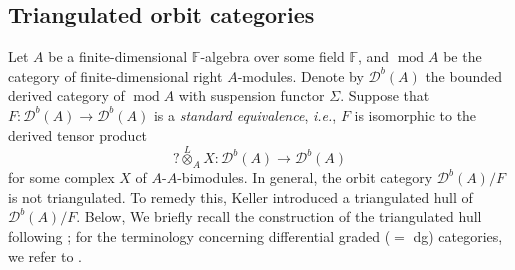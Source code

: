 \documentclass[12pt,reqno]{amsart}
\numberwithin{equation}{section}
\newcommand{\ie}{{\em i.e.}}
\renewcommand{\mod}{\operatorname{mod}\nolimits}
\newcommand{\Hom}{\operatorname{Hom}\nolimits}
\begin{document}
	
	\subsection{Triangulated orbit categories}\label{ss-Tri-orb-Cat}
	
	Let $A$ be a finite-dimensional $\mathbb{F}$-algebra over some field $\mathbb{F}$, and $\mod A$ be the category of finite-dimensional right $A$-modules. Denote by $\mathcal{D}^b(A)$ the bounded derived category of $\mod A$ with suspension functor $\Sigma$.
	Suppose that $F:\mathcal{D}^b(A)\rightarrow \mathcal{D}^b(A)$ is a {\it standard equivalence}, \ie, $F$ is isomorphic to the derived tensor product
	\[
	? \stackrel{L}{\otimes}_{A} X: \mathcal{D}^{b}(A) \longrightarrow \mathcal{D}^{b}(A)
	\]
	for some complex $X$ of $A$-$A$-bimodules.  In general, the orbit category $\mathcal{D}^b(A)/F$ is not triangulated. To remedy this, Keller introduced a triangulated hull of $\mathcal{D}^b(A)/F$.
	Below, We briefly recall the construction of the triangulated hull following \cite[Section~5]{Ke05-tri-orb-cat}; for the
	terminology concerning differential graded ($=$ dg) categories, we refer to
	\cite{Ke94-dg-cat}.
	
\end{document}
